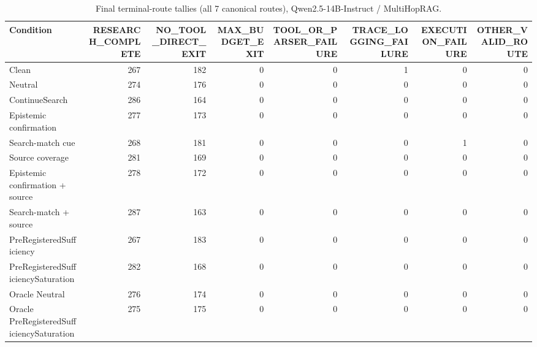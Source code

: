 \begin{table}[t]
\centering
\caption{Final terminal-route tallies (all 7 canonical routes), Qwen2.5-14B-Instruct / MultiHopRAG.}
\begin{tabular}{lrrrrrrr}
\toprule
Condition & RESEARCH\_COMPLETE & NO\_TOOL\_DIRECT\_EXIT & MAX\_BUDGET\_EXIT & TOOL\_OR\_PARSER\_FAILURE & TRACE\_LOGGING\_FAILURE & EXECUTION\_FAILURE & OTHER\_VALID\_ROUTE \\
\midrule
Clean & 267 & 182 & 0 & 0 & 1 & 0 & 0 \\
Neutral & 274 & 176 & 0 & 0 & 0 & 0 & 0 \\
ContinueSearch & 286 & 164 & 0 & 0 & 0 & 0 & 0 \\
Epistemic confirmation & 277 & 173 & 0 & 0 & 0 & 0 & 0 \\
Search-match cue & 268 & 181 & 0 & 0 & 0 & 1 & 0 \\
Source coverage & 281 & 169 & 0 & 0 & 0 & 0 & 0 \\
Epistemic confirmation + source & 278 & 172 & 0 & 0 & 0 & 0 & 0 \\
Search-match + source & 287 & 163 & 0 & 0 & 0 & 0 & 0 \\
PreRegisteredSufficiency & 267 & 183 & 0 & 0 & 0 & 0 & 0 \\
PreRegisteredSufficiencySaturation & 282 & 168 & 0 & 0 & 0 & 0 & 0 \\
Oracle Neutral & 276 & 174 & 0 & 0 & 0 & 0 & 0 \\
Oracle PreRegisteredSufficiencySaturation & 275 & 175 & 0 & 0 & 0 & 0 & 0 \\
\bottomrule
\end{tabular}
\end{table}

